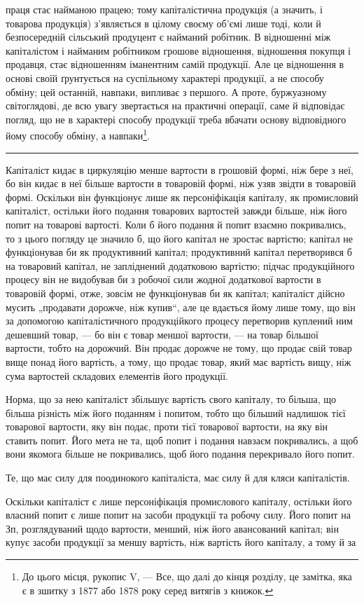 \parcont{}  %
праця стає найманою працею; тому капіталістична продукція (а значить,
і товарова продукція) з’являється в цілому своєму об’ємі лише тоді,
коли й безпосередній сільський продуцент є найманий робітник. В відношенні
між капіталістом і найманим робітником грошове відношення, відношення покупця і продавця, стає
відношенням іманентним самій продукції. Але це відношення в основі своїй ґрунтується на суспільному
характері продукції, а не способу обміну; цей останній, навпаки, випливає з першого.
А проте, буржуазному світоглядові, де всю увагу звертається на практичні
операції, саме й відповідає погляд, що не в характері способу продукції
треба вбачати основу відповідного йому способу обміну, а навпаки\footnote{
До цього місця, рукопис V, — Все, що далі до кінця розділу, це замітка, яка є в зшитку з 1877 або
1878 року серед витягів з книжок.
}.

\pfbreak{}

\label{original-76}
Капіталіст кидає в циркуляцію менше вартости в грошовій формі,
ніж бере з неї, бо він кидає в неї більше вартости в товаровій формі,
ніж узяв звідти в товаровій формі. Оскільки він функціонує лише як персоніфікація
капіталу, як промисловий капіталіст, остільки його подання
товарових вартостей завжди більше, ніж його попит на товарові вартості.
Коли б його подання й попит взаємно покривались, то з цього погляду
це значило б, що його капітал не зростає вартістю; капітал не функціонував
би як продуктивний капітал; продуктивний капітал перетворився б
на товаровий капітал, не запліднений додатковою вартістю; підчас продукційного
процесу він не видобував би з робочої сили жодної додаткової
вартости в товаровій формі, отже, зовсім не функціонував би як
капітал; капіталіст дійсно мусить „продавати дорожче, ніж купив“, але
це вдається йому лише тому, що він за допомогою капіталістичного
продукційкого процесу перетворив куплений ним дешевший товар, — бо він
є товар меншої вартости, — на товар більшої вартости, тобто на дорожчий.
Він продає дорожче не тому, що продає свій товар вище понад його
вартість, а тому, що продає товар, який має вартість вищу, ніж сума
вартостей складових елементів його продукції.

Норма, що за нею капіталіст збільшує вартість свого капіталу, то більша,
що більша різність між його поданням і попитом, тобто що більший
надлишок тієї товарової вартости, яку він подає, проти тієї товарової
вартости, на яку він ставить попит. Його мета не та, щоб попит і
подання навзаєм покривались, а щоб вони якомога більше не покривались,
щоб його подання перекривало його попит.

Те, що має силу для поодинокого капіталіста, має силу й для кляси
капіталістів.

Оскільки капіталіст є лише персоніфікація промислового капіталу,
остільки його власний попит є лише попит на засоби продукції та
робочу силу. Його попит на Зп, розглядуваний щодо вартости,
менший, ніж його авансований капітал; він купує засоби продукції
за меншу вартість, ніж вартість його капіталу, а тому й за
\parbreak{}  %
